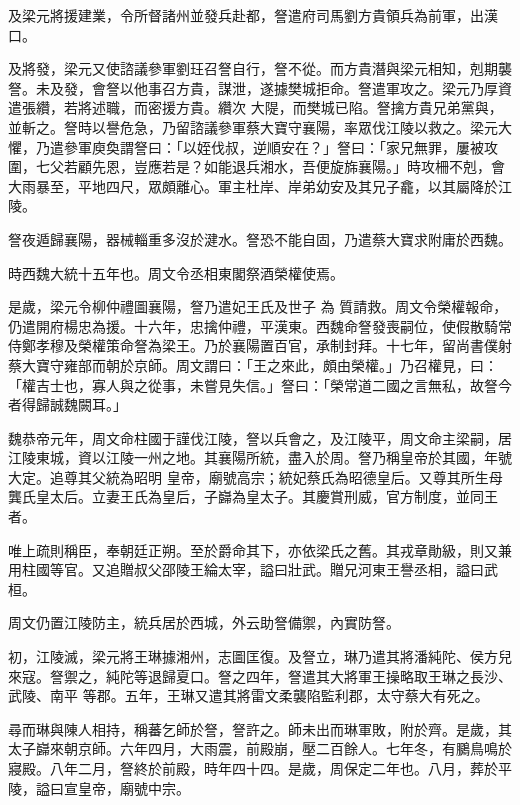 \begin{pinyinscope}
 及梁元將援建業，令所督諸州並發兵赴都，詧遣府司馬劉方貴領兵為前軍，出漢口。



 及將發，梁元又使諮議參軍劉玨召詧自行，詧不從。而方貴潛與梁元相知，剋期襲詧。未及發，會詧以他事召方貴，謀泄，遂據樊城拒命。詧遣軍攻之。梁元乃厚資遣張纘，若將述職，而密援方貴。纘次
 大隄，而樊城已陷。詧擒方貴兄弟黨與，並斬之。詧時以譽危急，乃留諮議參軍蔡大寶守襄陽，率眾伐江陵以救之。梁元大懼，乃遣參軍庾奐謂詧曰：「以姪伐叔，逆順安在？」詧曰：「家兄無罪，屢被攻圍，七父若顧先恩，豈應若是？如能退兵湘水，吾便旋旆襄陽。」時攻柵不剋，會大雨暴至，平地四尺，眾頗離心。軍主杜岸、岸弟幼安及其兄子龕，以其屬降於江陵。



 詧夜遁歸襄陽，器械輜重多沒於湕水。詧恐不能自固，乃遣蔡大寶求附庸於西魏。



 時西魏大統十五年也。周文令丞相東閣祭酒榮權使焉。


是歲，梁元令柳仲禮圖襄陽，詧乃遣妃王氏及世子
 為
 質請救。周文令榮權報命，仍遣開府楊忠為援。十六年，忠擒仲禮，平漢東。西魏命詧發喪嗣位，使假散騎常侍鄭孝穆及榮權策命詧為梁王。乃於襄陽置百官，承制封拜。十七年，留尚書僕射蔡大寶守雍部而朝於京師。周文謂曰：「王之來此，頗由榮權。」乃召權見，曰：「權吉士也，寡人與之從事，未嘗見失信。」詧曰：「榮常道二國之言無私，故詧今者得歸誠魏闕耳。」



 魏恭帝元年，周文命柱國于謹伐江陵，詧以兵會之，及江陵平，周文命主梁嗣，居江陵東城，資以江陵一州之地。其襄陽所統，盡入於周。詧乃稱皇帝於其國，年號大定。追尊其父統為昭明
 皇帝，廟號高宗；統妃蔡氏為昭德皇后。又尊其所生母龔氏皇太后。立妻王氏為皇后，子巋為皇太子。其慶賞刑威，官方制度，並同王者。



 唯上疏則稱臣，奉朝廷正朔。至於爵命其下，亦依梁氏之舊。其戎章勛級，則又兼用柱國等官。又追贈叔父邵陵王綸太宰，謚曰壯武。贈兄河東王譽丞相，謚曰武桓。



 周文仍置江陵防主，統兵居於西城，外云助詧備禦，內實防詧。



 初，江陵滅，梁元將王琳據湘州，志圖匡復。及詧立，琳乃遣其將潘純陀、侯方兒來寇。詧禦之，純陀等退歸夏口。詧之四年，詧遣其大將軍王操略取王琳之長沙、武陵、南平
 等郡。五年，王琳又遣其將雷文柔襲陷監利郡，太守蔡大有死之。



 尋而琳與陳人相持，稱蕃乞師於詧，詧許之。師未出而琳軍敗，附於齊。是歲，其太子巋來朝京師。六年四月，大雨震，前殿崩，壓二百餘人。七年冬，有鵩鳥鳴於寢殿。八年二月，詧終於前殿，時年四十四。是歲，周保定二年也。八月，葬於平陵，謚曰宣皇帝，廟號中宗。




\end{pinyinscope}
